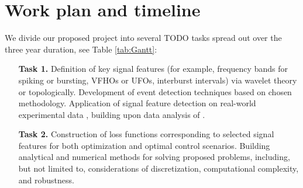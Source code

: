 \documentclass[a4paper,11pt]{scrartcl}
\begin{document}
\section{Work plan and timeline}\label{sec:workplan}

We divide our proposed project into several TODO tasks spread out over the three year duration, see Table \ref{tab:Gantt}:

\begin{itemize}
    \item[\textbf{Task 1.}] Definition of key signal features (for example, frequency bands for spiking or bursting, VFHOs or UFOs, interburst intervals) via wavelet theory or topologically. Development of event detection techniques based on chosen methodology. Application of signal feature detection on real-world experimental data \cite{Brazdil2017}, building upon data analysis of \cite{Halastova2025}.
    \item[\textbf{Task 2.}] Construction of loss functions corresponding to selected signal features for both optimization and optimal control scenarios. Building analytical and numerical methods for solving proposed problems, including, but not limited to, considerations of discretization, computational complexity, and robustness.
\end{itemize}
\end{document}
